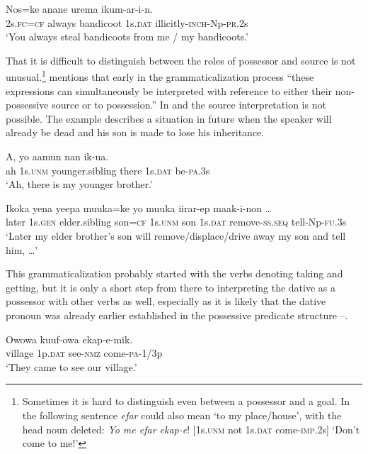 \ea%
\label{ex:3:x581}
\gll Nos=ke anane urema  ikum-ar-i-n. \\
2s.\textsc{fc}=\textsc{cf} always bandicoot 1s.\textsc{dat} illicitly-\textsc{inch}-Np-\textsc{pr}.2s\\
\glt`You always steal bandicoots from me / my bandicoots.'
\z

That it is difficult to distinguish between the roles of possessor and source is not unusual.\footnote{Sometimes it is hard to distinguish even between a possessor and a goal. In the following sentence \textit{efar} could also mean `to my place/house', with the head noun deleted: \textit{Yo me efar ekap-e}! [1s.\textsc{unm} not 1s.\textsc{dat} come-\textsc{imp}.2s] `Don't come to me!' } \citet[133]{Heine1997} mentions that early in the grammaticalization process ``these expressions can simultaneously be interpreted with reference to either their non-posses\-sive source or to possession.'' In  and  the source interpretation is not possible. The example  describes a situation in future when the speaker will already be dead and his son is made to lose his inheritance.

\ea%
\label{ex:3:x1861}
\gll A, yo aamun nan  ik-ua. \\
ah 1s.\textsc{unm} younger.sibling there 1s.\textsc{dat} be-\textsc{pa}.3s\\
\glt`Ah, there is my younger brother.'
\z

\ea%
\label{ex:3:x1862}
\gll Ikoka yena yeepa muuka=ke yo muuka  iirar-ep maak-i-non {\dots}\\
later 1s.\textsc{gen} elder.sibling son=\textsc{cf} 1s.\textsc{unm} son 1s.\textsc{dat} remove-\textsc{ss}.\textsc{seq} tell-Np-\textsc{fu}.3s\\
\glt`Later my elder brother's son will remove/displace/drive away my son and tell him, {\dots}'
\z

This grammaticalization probably started with the verbs denoting taking and getting, but it is only a short step from there to interpreting the dative as a possessor with other verbs as well, especially as it is likely that the dative pronoun was already earlier established in the possessive predicate structure --. 

\ea%
\label{ex:3:x1789}
\gll Owowa  kuuf-owa ekap-e-mik. \\
village 1p.\textsc{dat} see-\textsc{nmz} come-\textsc{pa}-1/3p\\
\glt`They came to see our village.'
\z

